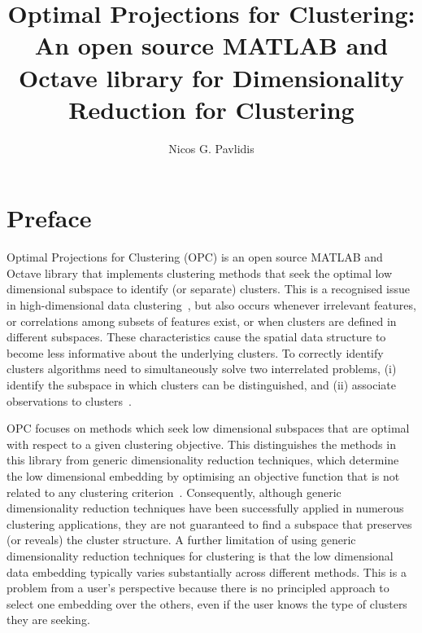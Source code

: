 \documentclass{book}
\title{Optimal Projections for Clustering: An open source MATLAB and Octave library for Dimensionality Reduction for Clustering}
\author{Nicos G. Pavlidis}
\date{}
\def\mm#1{$#1$}
\begin{document}
\begin{htmlonly}
\def\href#1#2{\htmladdnormallink{#2}{#1}}
\def\mm#1{{\it #1}}
\end{htmlonly}

\maketitle
\tableofcontents

\chapter{Preface}

Optimal Projections for Clustering (OPC)
is an open source MATLAB and Octave library that implements
clustering methods that seek the optimal low dimensional subspace to identify
(or separate) clusters.
%
This is a recognised issue in high-dimensional data
clustering~\cite{KriegelKZ2009}, but also occurs whenever irrelevant features,
or correlations among subsets of features exist, or when
clusters are defined in different subspaces. These characteristics cause
the spatial data structure to become
less informative about the underlying clusters. To correctly identify clusters
algorithms need to simultaneously solve two interrelated problems,
(i) identify the subspace in which clusters can be distinguished, and (ii)
associate observations to clusters~\cite{KriegelKZ2009}.



OPC focuses on methods which seek low dimensional subspaces that are optimal
with respect to a given clustering objective.
%
This distinguishes the methods in this library from generic dimensionality
reduction techniques,
%
which determine the low dimensional embedding by optimising an objective
function that is not related to any clustering criterion~\cite{MaatenPH2009}. 
%
Consequently, although generic dimensionality reduction techniques have been
successfully applied in numerous clustering applications, they are not
guaranteed to find a subspace that preserves (or reveals) the cluster
structure. 
%
A further limitation of using generic dimensionality reduction techniques for
clustering is that the low dimensional data embedding typically varies
substantially across different methods. This is a problem from a user's
perspective because there is no principled approach to select one embedding
over the others, even if the user knows the type of clusters they are
seeking.
\end{document}
